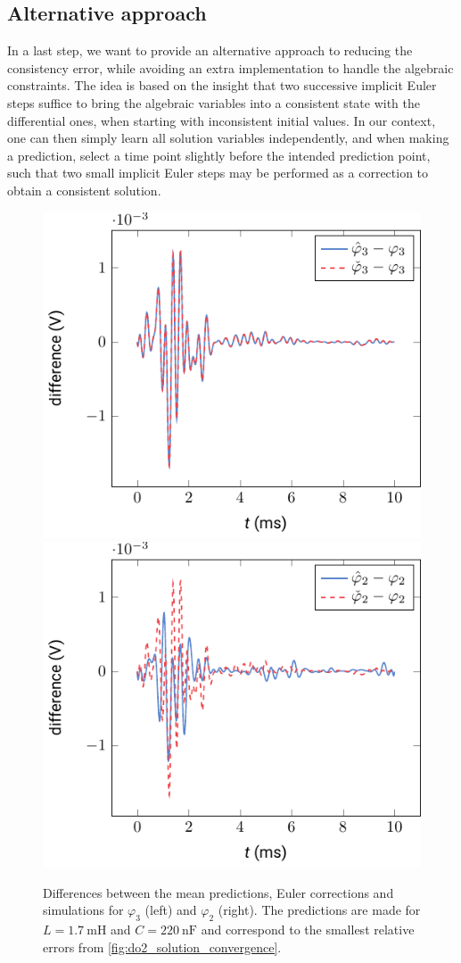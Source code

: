 \documentclass[AMA,STIX1COL]{WileyNJD-v2}
\begin{document}
\subsection{Alternative approach}
\label{subsec:aa}
In a last step, we want to provide an alternative approach to reducing the consistency error, while avoiding an extra implementation to handle the algebraic constraints. The idea is based on the insight that two successive implicit Euler steps suffice to bring the algebraic variables into a consistent state with the differential ones, when starting with inconsistent initial values\cite{garcia2022}. In our context, one can then simply learn all solution variables independently, and when making a prediction, select a time point slightly before the intended prediction point, such that two small implicit Euler steps may be performed as a correction to obtain a consistent solution.
\begin{figure}[t]
    \begin{center}
        \includegraphics[width=.4\textwidth]{do2_euler_phi_3} \hspace{1.5cm} \includegraphics[width=.4\textwidth]{do2_euler_phi_2}
    \end{center}
    \caption{Differences between the mean predictions, Euler corrections and simulations for $\varphi_3$ (left) and $\varphi_2$ (right). The predictions are made for $L = \SI{1.7}{\milli\henry}$ and $C = \SI{220}{\nano\farad}$ and correspond to the smallest relative errors from \autoref{fig:do2_solution_convergence}.}
    \label{fig:do2_euler}
\end{figure}
\end{document}
